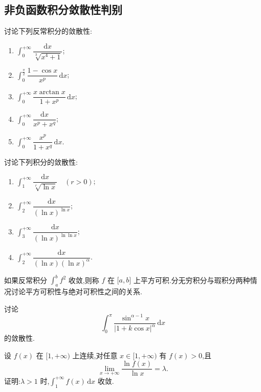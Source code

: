 \documentclass[../../数学分析培优讲义.tex]{subfiles}
\begin{document}
\subsection{非负函数积分敛散性判别}

\begin{example}
讨论下列反常积分的敛散性:
\begin{enumerate}[label=(\arabic*)]
    \item $\displaystyle\int_0^{+\infty}\dfrac{\mathrm{d}x}{\sqrt[3]{x^4+1}}$;
    \item $\displaystyle\int_0^{\frac{\pi}{2}}\dfrac{1-\cos x}{x^p}\,\mathrm{d}x$;
    \item $\displaystyle\int_0^{+\infty}\dfrac{x\arctan x}{1+x^p}\,\mathrm{d}x$;
    \item $\displaystyle\int_0^{+\infty}\dfrac{\mathrm{d}x}{x^p+x^q}$;
    \item $\displaystyle\int_0^{+\infty}\dfrac{x^p}{1+x^q}\,\mathrm{d}x$.
\end{enumerate}
\end{example}
\exampleblank

\begin{example}
讨论下列积分的敛散性:
\begin{enumerate}[label=(\arabic*)]
    \item $\displaystyle\int_1^{+\infty}\dfrac{\mathrm{d}x}{\sqrt[r]{\ln x}}\quad(r>0)$;
    \item $\displaystyle\int_2^{+\infty}\dfrac{\mathrm{d}x}{(\ln x)^{\ln x}}$;
    \item $\displaystyle\int_3^{+\infty}\dfrac{\mathrm{d}x}{(\ln x)^{\ln\ln x}}$;
    \item $\displaystyle\int_2^{+\infty}\dfrac{\mathrm{d}x}{(\ln x)(\ln x)^\alpha}$.
\end{enumerate}
\end{example}
\exampleblank

\begin{example}
如果反常积分 $\displaystyle\int_a^bf^2$ 收敛,则称 $f$ 在 $\lbrack a,b\rbrack$ 上平方可积.分无穷积分与瑕积分两种情况讨论平方可积性与绝对可积性之间的关系.
\end{example}
\exampleblank

\begin{example}
讨论
\[
    \int_0^\pi\dfrac{\sin^{\alpha-1}x}{|1+k\cos x|^\alpha}\,\mathrm{d}x
\]
的敛散性.
\end{example}
\exampleblank

\begin{example}
设 $f(x)$ 在 $\lbrack 1,+\infty)$ 上连续,对任意 $x\in\lbrack 1,+\infty)$ 有 $f(x)>0$,且
\[
    \lim\limits_{x\to+\infty}\dfrac{\ln f(x)}{\ln x}=\lambda.
\]
证明:$\lambda>1$ 时,$\displaystyle\int_1^{+\infty}f(x)\,\mathrm{d}x$ 收敛.
\end{example}
\exampleblank
\end{document}
